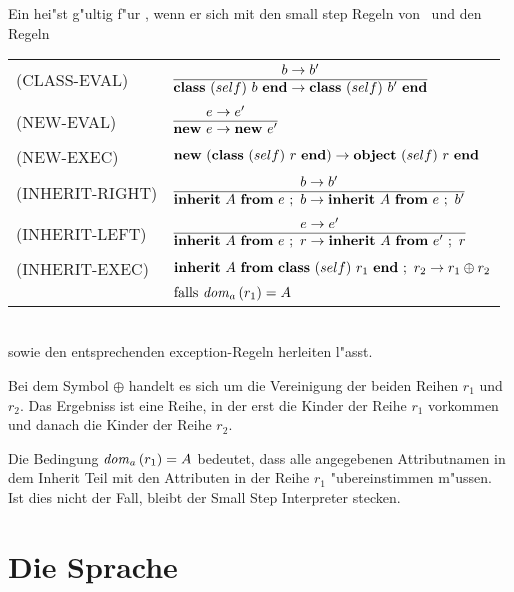 Ein  hei"st g"ultig f"ur \LTWOC, wenn er sich mit den small step Regeln von \LTWOO\ und den Regeln\\[5mm]
  \begin{tabular}{ll}
    \mbox{(CLASS-EVAL)}     & $\regel{b \to b'}
                                     {\class{self}{b} \to \class{self}{b'}}$ \\[5mm]
    \mbox{(NEW-EVAL)}       & $\regel{e \to e'}
                                     {\new{e} \to \new{e'}}$ \\[5mm]
    \mbox{(NEW-EXEC)}       & $\textbf{new}\ (\textbf{class}\ (self)\ r\ \textbf{end}) \to \textbf{object}\ (self)\ r\ \textbf{end}$ \\[3mm]
    \mbox{(INHERIT-RIGHT)}  & $\regel{b \to b'}
                                     {\inherit{A}{e}{b} \to \inherit{A}{e}{b'}}$ \\[5mm]
    \mbox{(INHERIT-LEFT)}   & $\regel{e \to e'}
                                     {\inherit{A}{e}{r} \to \inherit{A}{e'}{r}}$ \\[5mm]
    \mbox{(INHERIT-EXEC)}   & $\textbf{inherit}\ A\ \textbf{from}\ \textbf{class}\ (self)\ r_1\ \textbf{end}\ ;\ r_2 \to r_1 \oplus r_2$ \\
                            & $\text{falls } {\text{\it dom\/}}_a\,(r_1) = A$
  \end{tabular}\\[7mm]
sowie den entsprechenden exception-Regeln herleiten l"asst.

Bei dem Symbol $\oplus$ handelt es sich um die Vereinigung der beiden Reihen $r_1$ und $r_2$.
Das Ergebniss ist eine Reihe, in der erst die Kinder der Reihe $r_1$ vorkommen und danach
die Kinder der Reihe $r_2$.

Die Bedingung ${\text{\it dom\/}}_a\,(r_1) = A$ bedeutet, dass alle angegebenen
Attributnamen in dem Inherit Teil mit den Attributen in der Reihe $r_1$ "ubereinstimmen m"ussen.
Ist dies nicht der Fall, bleibt der Small Step Interpreter stecken.


\section{Die Sprache \LTHREE}

